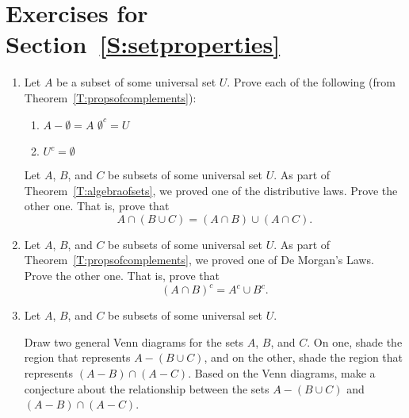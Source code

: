 \section*{Exercises for Section~\ref{S:setproperties}}
%
\begin{enumerate}
\item Let  $A$ be a subset of some universal set  $U$\!.  Prove each of the following (from Theorem~\ref{T:propsofcomplements}):\label{exer:sec43-1}
\begin{multicols}{2}
  \begin{enumerate}
    \yitem $\left( A^c \right)^c = A$
    \item $A - \emptyset = A$
    \yitem $\emptyset^c = U$
    \item $U^c = \emptyset$
  \end{enumerate}
\end{multicols}

%
%

\xitem Let  $A$, $B$,  and  $C$  be subsets of some universal set  $U$\!.	As part of 
Theorem~\ref{T:algebraofsets}, we proved one of the distributive laws.  Prove the other one.  That is, prove that
\label{exer:distributive}%
\[
A \cap \left( {B \cup C} \right) = \left( {A \cap B} \right) \cup \left( {A \cap C} \right)\!.
\]

\item Let  $A$, $B$,  and  $C$  be subsets of some universal set  $U$.	As part of 
Theorem~\ref{T:propsofcomplements}, we proved one of De Morgan's Laws.  Prove the other one.  That is, prove that
\label{exer:demorgan}%
\[
\left( {A \cap B} \right)^c  = A^c  \cup B^c.
\]

\item Let  $A$, $B$,  and  $C$  be subsets of some universal set  $U$\!.
\label{exer:sec43-5}%
\begin{enumerate}
  \yitem Draw two general Venn diagrams for the sets  $A$, $B$, and  $C$.  On one, shade the region that represents  $A - \left( {B \cup C} \right)$, and on the other, shade the region that represents  $\left( {A - B} \right) \cap \left( {A - C} \right)$.  Based on the Venn diagrams, make a conjecture about the relationship between the sets  $A - \left( {B \cup C} \right)$  and  $\left( {A - B} \right) \cap \left( {A - C} \right)$.
\label{exer:sec43-setdiff}%


\end{enumerate}
\end{enumerate}
